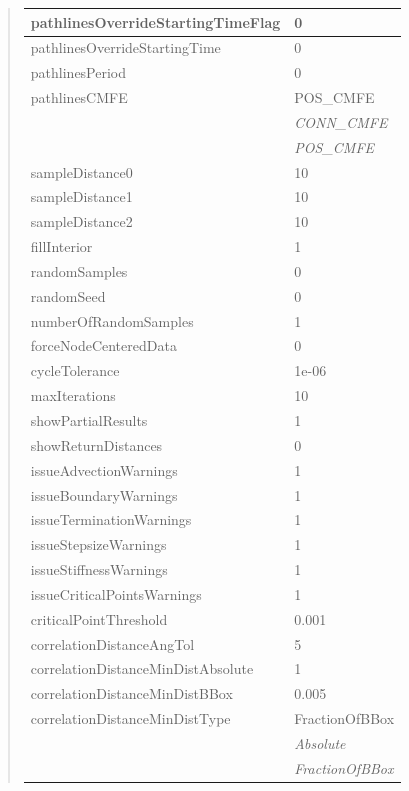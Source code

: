 \documentclass[letterpaper,10pt,english]{sphinxmanual}
\begin{document}
\begin{quote}
\begin{longtable}{|l|l|}
\hline
pathlinesOverrideStartingTimeFlag
 & 
0
\\
\hline
pathlinesOverrideStartingTime
 & 
0
\\
\hline
pathlinesPeriod
 & 
0
\\
\hline
pathlinesCMFE
 & 
POS\_CMFE
\\
\hline & 
\emph{CONN\_CMFE}
\\
\hline & 
\emph{POS\_CMFE}
\\
\hline
sampleDistance0
 & 
10
\\
\hline
sampleDistance1
 & 
10
\\
\hline
sampleDistance2
 & 
10
\\
\hline
fillInterior
 & 
1
\\
\hline
randomSamples
 & 
0
\\
\hline
randomSeed
 & 
0
\\
\hline
numberOfRandomSamples
 & 
1
\\
\hline
forceNodeCenteredData
 & 
0
\\
\hline
cycleTolerance
 & 
1e-06
\\
\hline
maxIterations
 & 
10
\\
\hline
showPartialResults
 & 
1
\\
\hline
showReturnDistances
 & 
0
\\
\hline
issueAdvectionWarnings
 & 
1
\\
\hline
issueBoundaryWarnings
 & 
1
\\
\hline
issueTerminationWarnings
 & 
1
\\
\hline
issueStepsizeWarnings
 & 
1
\\
\hline
issueStiffnessWarnings
 & 
1
\\
\hline
issueCriticalPointsWarnings
 & 
1
\\
\hline
criticalPointThreshold
 & 
0.001
\\
\hline
correlationDistanceAngTol
 & 
5
\\
\hline
correlationDistanceMinDistAbsolute
 & 
1
\\
\hline
correlationDistanceMinDistBBox
 & 
0.005
\\
\hline
correlationDistanceMinDistType
 & 
FractionOfBBox
\\
\hline & 
\emph{Absolute}
\\
\hline & 
\emph{FractionOfBBox}
\\
\hline\end{longtable}

\end{quote}
\end{document}
